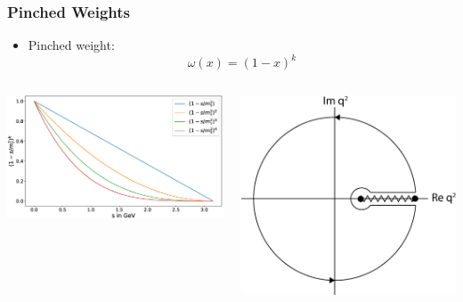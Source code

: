 \documentclass{beamer}
\begin{document}
\begin{frame}
  \frametitle{Pinched Weights}
  \begin{itemize}
    \item Pinched weight:
      \begin{equation}
        \omega(x) = \left( 1 - x \right)^k
      \end{equation}
  \end{itemize}
  \begin{columns}
    \begin{column}{.7\textwidth}
      \includegraphics[width=\textwidth]{./images/monomialWeightGraphs.eps}
    \end{column}
    \begin{column}{.3\textwidth}
      \includegraphics[width=\textwidth]{./images/complexCountour.eps}
    \end{column}
  \end{columns}
\end{frame}
\end{document}
